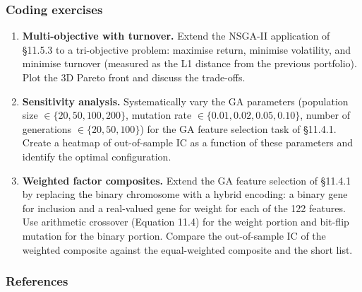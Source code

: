\subsubsection{Coding exercises}

\begin{enumerate}
\item \textbf{Multi-objective with turnover.} Extend the NSGA-II application of §11.5.3 to a tri-objective problem: maximise return, minimise volatility, and minimise turnover (measured as the L1 distance from the previous portfolio). Plot the 3D Pareto front and discuss the trade-offs.
\item \textbf{Sensitivity analysis.} Systematically vary the GA parameters (population size $\in \{20, 50, 100, 200\}$, mutation rate $\in \{0.01, 0.02, 0.05, 0.10\}$, number of generations $\in \{20, 50, 100\}$) for the GA feature selection task of §11.4.1. Create a heatmap of out-of-sample IC as a function of these parameters and identify the optimal configuration.
\item \textbf{Weighted factor composites.} Extend the GA feature selection of §11.4.1 by replacing the binary chromosome with a hybrid encoding: a binary gene for inclusion and a real-valued gene for weight for each of the 122 features. Use arithmetic crossover (Equation 11.4) for the weight portion and bit-flip mutation for the binary portion. Compare the out-of-sample IC of the weighted composite against the equal-weighted composite and the short list.
\end{enumerate}

\subsubsection{References}